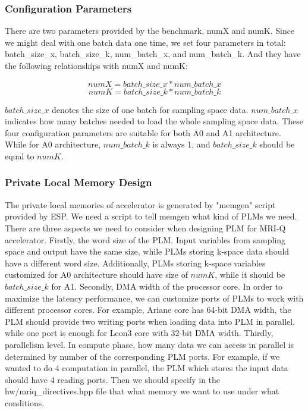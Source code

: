 \subsubsection{Configuration Parameters}

There are two parameters provided by the benchmark, numX and numK. Since we
might deal with one batch data one time, we set four parameters in total:
batch\_size\_x, batch\_size\_k, num\_batch\_x, and num\_batch\_k. And they have
the following relationships with numX and numK:

    $$numX = batch\_size\_x * num\_batch\_x$$
    $$numK = batch\_size\_k * num\_batch\_k$$

$batch\_size\_x$ denotes the size of one batch for sampling space
data. $num\_batch\_x$ indicates how many batches needed to load the whole
sampling space data. These four configuration parameters are suitable for both
A0 and A1 architecture. While for A0 architecture, $num\_batch\_k$ is always 1,
and $batch\_size\_k$ should be equal to $numK$.\\

\subsubsection{Private Local Memory Design}

The private local memories of accelerator is generated by "memgen" script
provided by ESP. We need a script to tell memgen what kind of PLMs we
need. There are three aspects we need to consider when designing PLM for MRI-Q
accelerator. Firstly, the word size of the PLM. Input variables from sampling
space and output have the same size, while PLMs storing k-space data should have
a different word size. Additionally, PLMs storing k-space variables customized
for A0 architecture should have size of $numK$, while it should be
$batch\_size\_k$ for A1. Secondly, DMA width of the processor core. In order to
maximize the latency performance, we can customize ports of PLMs to work with
different processor cores. For example, Ariane core has 64-bit DMA width, the
PLM should provide two writing ports when loading data into PLM in
parallel. while one port is enough for Leon3 core with 32-bit DMA
width. Thirdly, parallelism level. In compute phase, how many data we can access
in parallel is determined by number of the corresponding PLM ports. For example,
if we wanted to do 4 computation in parallel, the PLM which stores the input
data should have 4 reading ports. Then we should specify in the
hw/mriq\_directives.hpp file that what memory we want to use under what
conditions.


